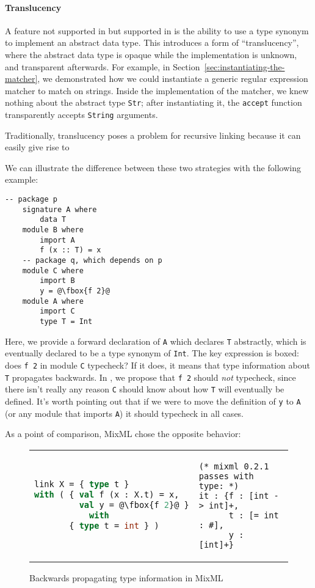 \paragraph{Translucency}  A feature not supported in \OldBackpack{}
but supported in \Backpack{} is
the ability to use a type synonym to implement an abstract data type.
This introduces a form of ``translucency'', where the abstract data type
is opaque while the implementation is unknown, and transparent afterwards.
For example, in Section~\ref{sec:instantiating-the-matcher}, we demonstrated
how we could instantiate a generic regular expression matcher to match on strings.
Inside the implementation of the matcher, we knew nothing about the abstract
type \verb|Str|; after instantiating it, the \verb|accept| function
transparently accepts \verb|String| arguments.

Traditionally, translucency poses a problem for recursive linking
because it can easily give rise to 

We can illustrate the difference between these two strategies with
the following example:

\begin{lstlisting}[escapechar=@]
    -- package p
    signature A where
        data T
    module B where
        import A
        f (x :: T) = x
    -- package q, which depends on p
    module C where
        import B
        y = @\fbox{f 2}@
    module A where
        import C
        type T = Int
\end{lstlisting}
%
Here, we provide a forward declaration of \verb|A| which
declares \verb|T| abstractly, which is eventually declared to be
a type synonym of \verb|Int|.  The key expression is boxed: does \verb|f 2|
in module \verb|C| typecheck?  If it does, it means that type information
about \verb|T| propagates backwards.  In \Backpack{}, we propose
that \verb|f 2| should \emph{not} typecheck, since there isn't really
any reason \verb|C| should know about how \verb|T| will eventually
be defined.  It's worth pointing out that if we were to move the
definition of \verb|y| to \verb|A| (or any module that imports \verb|A|)
it should typecheck in all cases.

As a point of comparison, MixML chose the opposite behavior:

\begin{figure}[H]
\begin{tabular}{p{} p{}}
\begin{lstlisting}[language=ML,escapechar=@]
link X = { type t }
with ( { val f (x : X.t) = x,
         val y = @\fbox{f 2}@ }
           with
       { type t = int } )
\end{lstlisting}
&
\begin{verbatim}
(* mixml 0.2.1 passes with type: *)
it : {f : [int -> int]+,
      t : [= int : #],
      y : [int]+}
\end{verbatim}
\end{tabular}
\caption{Backwards propagating type information in MixML}
\label{fig:double-vision-backwards-propagating-mixml}
\end{figure}

